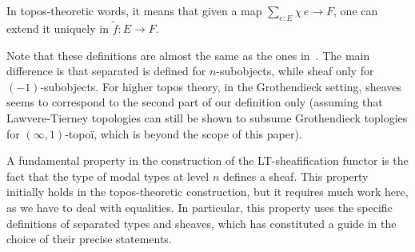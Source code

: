 \documentclass[preprint,9pt,numbers]{sigplanconf}
\begin{document}
In topos-theoretic words, it means that given a map $\sum_{e:E}
\chi\, e\to F$, one can
extend it uniquely in $\tilde f:E \to F$.

Note that these definitions are almost the same as the ones
in~\cite{maclanemoerdijk}. The main difference is that {separated}
is defined for $n$-subobjects, while {sheaf} only for
$(-1)$-subobjects.
%
For higher topos theory, in the Grothendieck setting, sheaves seems
to correspond to the second part of our definition only (assuming that
Lawvere-Tierney topologies can still be shown to subsume Grothendieck
toplogies for $(\infty,1)$-topoï, which is beyond the scope of this paper).
%

A fundamental property in the construction of the LT-sheafifica\-tion
functor is the fact that the type of modal types at level $n$ defines
a sheaf.
%
This property initially holds in the topos-theoretic construction, but
it requires much work here, as we have to deal with equalities. In
particular, this property uses the specific definitions
of separated types and sheaves, which has constituted a guide in the
choice of their precise statements. 
\end{document}
